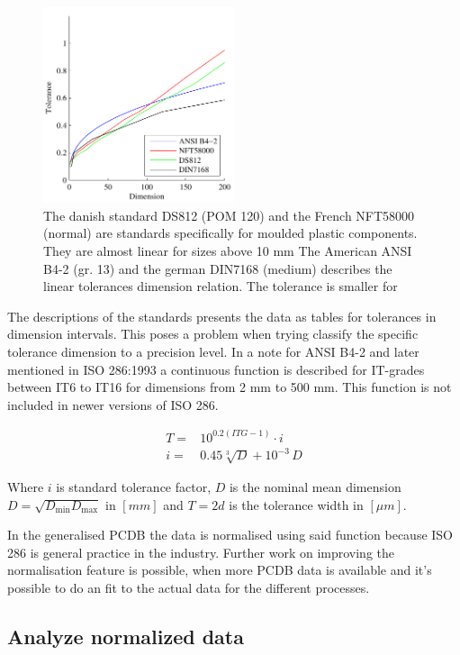 \documentclass[aip,amsmath, reprint, author-year]{revtex4-1}
\begin{document}
\begin{figure}
\includegraphics[width=0.5\textwidth]{Tolerance_standards.pdf}
\caption{\label{fig:tolstd} The danish standard DS812 (POM 120) and the French NFT58000 (normal) are standards specifically for moulded plastic components. They are almost linear for sizes above 10 mm The American ANSI B4-2 (gr. 13) and the german DIN7168 (medium) describes the linear tolerances dimension relation. The tolerance is smaller for }
\end{figure}

The descriptions of the standards presents the data as tables for tolerances in dimension intervals. This poses a problem when trying classify the specific tolerance dimension to a precision level.
In a note for ANSI B4-2  and later mentioned in ISO 286:1993 a continuous function is described for IT-grades between IT6 to IT16 for dimensions from 2 mm to 500 mm. This function is not included in newer versions of ISO 286.

\begin{align}
	T =& 10^{0.2 (ITG -1)} \cdot i \\
	i =& 0.45 \sqrt[3]{D} + 10^{-3} \, D 
\end{align}

Where $i$ is standard tolerance factor, $D$ is the nominal mean dimension $D = \sqrt{D_{\textrm{min}} D_\textrm{max}}$ in $[mm]$ and $T = 2 d$ is the tolerance width in $[\mu m]$. 

In the generalised PCDB the data is normalised using said function because ISO 286 is general practice in the industry. 
Further work on improving the normalisation feature is possible, when more PCDB data is available and it's possible to do an fit to the actual data for the different processes.

\subsection{Analyze normalized data}
\end{document}
